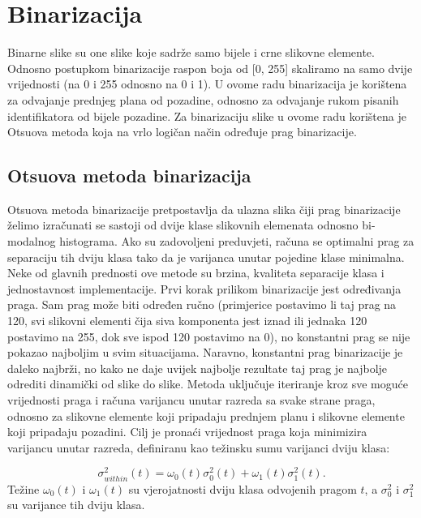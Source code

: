 \documentclass[times, utf8, diplomski]{fer}
\theoremstyle{definition}
\begin{document}
\section{Binarizacija}
Binarne slike su one slike koje sadrže samo bijele i crne slikovne elemente. Odnosno postupkom binarizacije raspon boja od [0, 255] skaliramo na samo dvije vrijednosti (na 0 i 255 odnosno na 0 i 1). U ovome radu binarizacija je korištena za odvajanje prednjeg plana od pozadine, odnosno za odvajanje rukom pisanih identifikatora od bijele pozadine. Za binarizaciju slike u ovome radu korištena je Otsuova metoda koja na vrlo logičan način određuje prag binarizacije.
\subsection{Otsuova metoda binarizacija}
Otsuova metoda binarizacije pretpostavlja da ulazna slika čiji prag binarizacije želimo izračunati se sastoji od dvije klase slikovnih elemenata odnosno bi-modalnog histograma. Ako su zadovoljeni preduvjeti, računa se optimalni prag za separaciju tih dviju klasa tako da je varijanca unutar pojedine klase minimalna. Neke od glavnih prednosti ove metode su brzina, kvaliteta separacije klasa i jednostavnost implementacije.
\newline
\newline
Prvi korak prilikom binarizacije jest određivanja praga. Sam prag može biti određen ručno (primjerice postavimo li taj prag na 120, svi slikovni elementi čija siva komponenta jest iznad ili jednaka 120 postavimo na 255, dok sve ispod 120 postavimo na 0), no konstantni prag se nije pokazao najboljim u svim situacijama. Naravno, konstantni prag binarizacije je daleko najbrži, no kako ne daje uvijek najbolje rezultate taj prag je najbolje odrediti dinamički od slike do slike.
Metoda uključuje iteriranje kroz sve moguće vrijednosti praga i računa varijancu unutar razreda sa svake strane praga, odnosno za slikovne elemente koji pripadaju prednjem planu i slikovne elemente koji pripadaju pozadini. Cilj je pronaći vrijednost praga koja minimizira varijancu unutar razreda, definiranu kao težinsku sumu varijanci dviju klasa:

\begin{equation}
\sigma^2_{within}(t) = \omega_0(t)\sigma_0^2(t) + \omega_1(t)\sigma_1^2(t).
\end{equation}
Težine $\omega_0(t)$ i $\omega_1(t)$ su vjerojatnosti dviju klasa odvojenih pragom $t$, a $\sigma_0^2$ i $\sigma_1^2$ su varijance tih dviju klasa.
\end{document}
